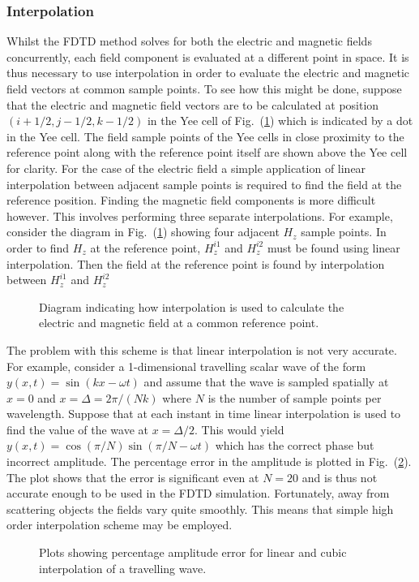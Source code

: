 \documentclass[a4paper, 12pt]{article}
\newcommand{\rfig}[1]{Fig.\ (\ref{#1})}
\begin{document}
	\subsubsection{Interpolation}
	Whilst the FDTD method solves for both the electric and magnetic
	fields concurrently, each field component is evaluated at a different
	point in space. It is thus necessary to use interpolation in order to
	evaluate the electric and magnetic field vectors at common sample
	points. To see how this might be done, suppose that the electric and
	magnetic field vectors are to be calculated at position
	$(i+1/2,j-1/2,k-1/2)$ in the Yee cell of
	\rfig{fig:fdtd:yeeinterp} which is indicated by a dot in the Yee
	cell. The field sample points of the Yee cells in close proximity to
	the reference point along with the reference point itself are shown above the Yee cell for clarity.  For the
	case of the electric field a simple application of linear
	interpolation between adjacent sample points is required to find the
	field at the reference position. Finding the magnetic field components
	is more difficult however. This involves performing three separate
	interpolations. For example, consider the diagram in
	\rfig{fig:fdtd:yeeinterp} showing four adjacent $H_z$ sample
	points. In order to find $H_z$ at the reference point, $H^{i1}_{z}$
	and $H^{i2}_z$ must be found using linear interpolation. Then the
	field at the reference point is found by interpolation between
	$H^{i1}_{z}$ and $H^{i2}_z$
	\begin{figure}[!h]
		\centering
		\caption{Diagram indicating how interpolation is used to calculate
			the electric and magnetic field at a common reference point.}
		\label{fig:fdtd:yeeinterp}
	\end{figure}

	The problem with this scheme is that linear interpolation is not very
	accurate. For example, consider a 1-dimensional travelling scalar wave
	of the form $y(x,t) = \sin(kx-\omega t)$ and assume that the wave is
	sampled spatially at $x=0$ and $x=\Delta=2\pi/(Nk)$ where $N$ is the
	number of sample points per wavelength. Suppose that at
	each instant in time linear interpolation is used to find the value of
	the wave at $x=\Delta/2$. This would yield
	$y(x,t)=\cos(\pi/N)\sin(\pi/N-\omega t)$ which has the correct phase
	but incorrect amplitude. The percentage error in the amplitude is
	plotted in \rfig{fig:fdtd:linearerror}. The plot shows that the error
	is significant even at $N=20$ and is thus not accurate enough to be
	used in the FDTD simulation. Fortunately, away from scattering objects
	the fields vary quite smoothly. This means that simple high order
	interpolation scheme may be employed.
	\begin{figure}[!h]
		\centering
		\caption{Plots showing percentage amplitude error for linear and
			cubic interpolation of a travelling wave.}
		\label{fig:fdtd:linearerror}
	\end{figure}
\end{document}
